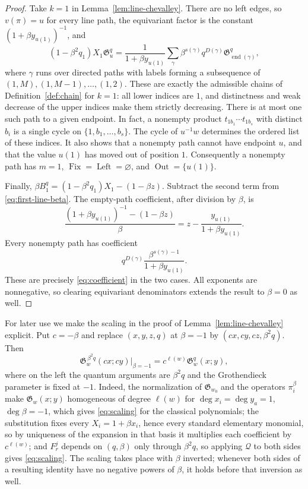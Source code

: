 \documentclass[11pt]{article}
\newcommand{\G}{\mathfrak{G}}
\newcommand{\Q}{\mathcal{Q}}
\newcommand{\Fix}{\operatorname{Fix}}
\newcommand{\Left}{\operatorname{Left}}
\newcommand{\Out}{\operatorname{Out}}
\newcommand{\ellength}{\ell}
\begin{document}
\begin{proof}
Take $k=1$ in Lemma~\ref{lem:line-chevalley}. There are no left
edges, so $v(\pi)=u$ for every line path, the equivariant factor is
the constant $(1+\beta y_{u(1)})^{-1}$, and
\begin{equation}\label{eq:first-line-beta}
 (1-\beta^2q_1)X_1\G_u^q
   =\frac{1}{1+\beta y_{u(1)}}
       \sum_{\gamma}\beta^{s(\gamma)}
           q^{D(\gamma)}\G_{\operatorname{end}(\gamma)}^q,
\end{equation}
where $\gamma$ runs over directed paths with labels forming a
subsequence of $(1,M),(1,M-1),\ldots,(1,2)$.
These are exactly the admissible chains of
Definition~\ref{def:chain} for $k=1$: all lower indices are $1$, and
distinctness and weak decrease of the upper indices make them
strictly decreasing.
There is at most one such path to a given endpoint.
In fact, a nonempty product
$t_{1b_1}\cdots t_{1b_s}$ with distinct $b_i$ is a single
cycle on $\{1,b_1,\ldots,b_s\}$.
The cycle of $u^{-1}w$ determines the ordered list of these
indices. It also shows that a nonempty path cannot have endpoint
$u$, and that the value $u(1)$ has moved out of position $1$.
Consequently a nonempty path has $m=1$,
$\Fix=\Left=\varnothing$, and $\Out=\{u(1)\}$.

Finally, $\beta B_1^q=(1-\beta^2q_1)X_1-(1-\beta z)$.
Subtract the second term from \eqref{eq:first-line-beta}.
The empty-path coefficient, after division by $\beta$, is
\[
 \frac{(1+\beta y_{u(1)})^{-1}-(1-\beta z)}{\beta}
       =z-\frac{y_{u(1)}}{1+\beta y_{u(1)}}.
\]
Every nonempty path has coefficient
\[
 q^{D(\gamma)}
       \frac{\beta^{s(\gamma)-1}}{1+\beta y_{u(1)}}.
\]
These are precisely \eqref{eq:coefficient} in the two cases.
All exponents are nonnegative, so clearing equivariant
denominators extends the result to $\beta=0$ as well.
\end{proof}

For later use we make the scaling in the proof of
Lemma~\ref{lem:line-chevalley} explicit. Put $c=-\beta$ and replace
$(x,y,z,q)$ at $\beta=-1$ by $(cx,cy,cz,\beta^2q)$. Then
\begin{equation}\label{eq:scaling}
 \G_w^{\,\beta^2q}(cx;cy)\big|_{\beta=-1}
       =c^{\ellength(w)}\G_w^q(x;y),
\end{equation}
where on the left the quantum arguments are $\beta^2q$ and the
Grothendieck parameter is fixed at $-1$. Indeed, the normalization of
$\G_{w_0}$ and the operators $\pi^\beta_i$ make $\G_w(x;y)$
homogeneous of degree $\ellength(w)$ for $\deg x_i=\deg y_a=1$,
$\deg\beta=-1$, which gives \eqref{eq:scaling} for the classical
polynomials; the substitution fixes every $X_i=1+\beta x_i$, hence
every standard elementary monomial, so by uniqueness of the expansion
in that basis it multiplies each coefficient by $c^{\ellength(w)}$;
and $F^j_r$ depends on $(q,\beta)$ only through $\beta^2q$, so
applying $\Q$ to both sides gives \eqref{eq:scaling}. The scaling
takes place with $\beta$ inverted; whenever both sides of a resulting
identity have no negative powers of $\beta$, it holds before that
inversion as well.
\end{document}
